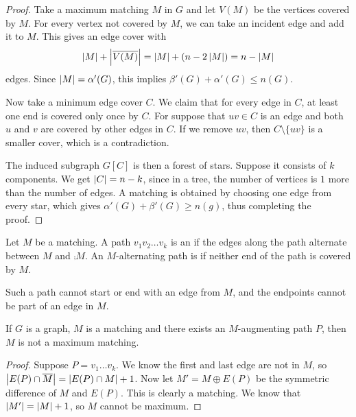 \begin{proof}
  Take a maximum matching $M$ in $G$ and let $V(M)$ be the vertices covered by
  $M$.
  For every vertex not covered by $M$, we can take an incident edge and add it
  to $M$.
  This gives an edge cover with
  \[
	\left| M \right| + \left| \overline{V(M)} \right| = \left| M \right| + (n - 2 \left| M \right|) = n - \left| M \right|
  \]
  edges.
  Since $\left| M \right| = \alpha'(G)$, this implies $\beta'(G) + \alpha'(G) \le n(G)$.

  Now take a minimum edge cover $C$.
  We claim that for every edge in $C$, at least one end is covered only once by
  $C$.
  For suppose that $uv \in C$ is an edge and both $u$ and $v$ are covered by
  other edges in $C$.
  If we remove $uv$, then $C \setminus \{uv\}$ is a smaller cover, which is a
  contradiction.

  The induced subgraph $G[C]$ is then a forest of stars.
  Suppose it consists of $k$ components.
  We get $\left| C \right| = n-k$, since in a tree, the number of vertices is $1$ more
  than the number of edges.
  A matching is obtained by choosing one edge from every star, which gives
  $\alpha'(G) + \beta'(G) \ge n(g)$, thus completing the proof.
\end{proof}


\begin{definition}
  Let $M$ be a matching.
  A path $v_1 v_2 \ldots v_k$ is an  if
  the edges along the path alternate between $M$ and $\comp{M}$.
  An $M$-alternating path is  if neither end of the path
  is covered by $M$.
\end{definition}

\begin{remark}
  Such a path cannot start or end with an edge from $M$, and the endpoints
  cannot be part of an edge in $M$.
\end{remark}

\begin{proposition}
  If $G$ is a graph, $M$ is a matching and there exists an $M$-augmenting path
  $P$, then $M$ is not a maximum matching.
\end{proposition}

\begin{proof}
  Suppose $P = v_1 \ldots v_k$.
  We know the first and last edge are not in $M$, so $\left| E(P) \cap \overline{M} \right| =
  \left| E(P) \cap M \right| + 1$.
  Now let $M' = M \oplus E(P)$ be the symmetric difference of $M$ and $E(P)$.
  This is clearly a matching.
  We know that $\left| M' \right| = \left| M \right| + 1$, so $M$ cannot be maximum.
\end{proof}


